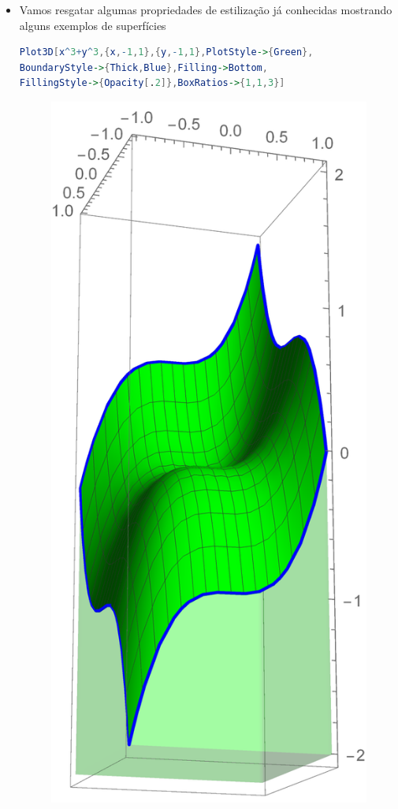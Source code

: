 \documentclass[a4paper, 12pt]{article}
\begin{document}
\begin{itemize}
		\item{}
			
			Vamos resgatar algumas propriedades de estilização já conhecidas mostrando alguns exemplos de superfícies 

\begin{lstlisting}[language=Mathematica]
Plot3D[x^3+y^3,{x,-1,1},{y,-1,1},PlotStyle->{Green}, 
BoundaryStyle->{Thick,Blue},Filling->Bottom, 
FillingStyle->{Opacity[.2]},BoxRatios->{1,1,3}]
\end{lstlisting}

			\begin{figure}[!h]
				\centering
				\includegraphics[scale=.2]{images/PlotStyle3d2}
			\end{figure}


\end{itemize}
\end{document}
